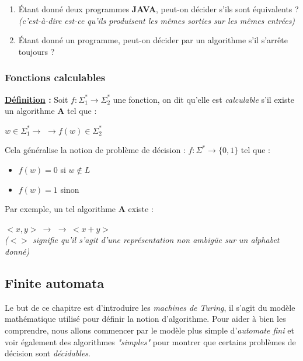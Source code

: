 \documentclass{article}
\newcommand{\titre}[1]{\textcolor{title}{#1}}
\newcommand{\tsect}[1]{\titre{\section{#1}}}
\newcommand{\tsssect}[1]{\titre{\subsubsection{#1}}}
\newcommand{\term}[1]{\textit{\textcolor{maintitle}{#1}}}
\begin{document}
\begin{sffamily}
\begin{enumerate}
\item Étant donné deux programmes \textbf{JAVA}, peut-on décider s'ils sont équivalents ? \textit{(c'est-à-dire est-ce 
qu'ils produisent les mêmes sorties sur les mêmes entrées)}

\item Étant donné un programme, peut-on décider par un algorithme s'il s'arrête toujours ?
\end{enumerate}

\tsssect{Fonctions calculables}

\noindent\textbf{\underline{Définition} :} Soit $f:\Sigma_1^* \to \Sigma_2^*$ une fonction, on dit qu'elle est 
\term{calculable} s'il existe un algorithme \textbf{A} tel que : \\

\begin{center}$w \in \Sigma_1^* \to$  $\to f(w) \in \Sigma_2^*$\end{center}

\noindent Cela généralise la notion de problème de décision : $f:\Sigma^*\to\{0,1\}$ tel que :
\begin{itemize}
\item $f(w) = 0$ si $w \not\in L$
\item $f(w) = 1$ sinon
\end{itemize}

\noindent Par exemple, un tel algorithme \textbf{A} existe : 

\begin{center}$<x,y>\ \to$  $\to\ <x+y>$ \\\textit{($< >$ signifie qu'il s'agit d'une représentation 
non ambigüe sur un alphabet donné)}
\end{center}

\newpage

\tsect{Finite automata}

Le but de ce chapitre est d'introduire les \term{machines de Turing}, il s'agit du modèle mathématique utilisé pour 
définir la notion d'algorithme. Pour aider à bien les comprendre, nous allons commencer par le modèle plus simple 
d'\term{automate fini} et voir également des algorithmes \textit{"simples"} pour montrer que certains problèmes de 
décision sont \term{décidables}. \\


\end{sffamily}
\end{document}
